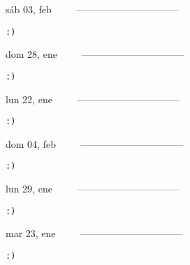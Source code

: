 \documentclass[letterpaper,10pt]{article}
\begin{document}
\begin{multicols}{3}
{sáb 03, feb\ \ \ \ \ --------------------------------}
\begin{flushright}\begin{small}\texttt{:)}\end{small}\end{flushright}
\vfill
{dom 28, ene\ \ \ \ \ --------------------------------}
\begin{flushright}\begin{small}\texttt{:)}\end{small}\end{flushright}\par
\vfill
{lun 22, ene\ \ \ \ \ --------------------------------}
\begin{flushright}\begin{small}\texttt{:)}\end{small}\end{flushright}\par
\vfill
\end{multicols}
\vspace{1.05cm}

\begin{multicols}{3}
{dom 04, feb\ \ \ \ \ --------------------------------}
\begin{flushright}\begin{small}\texttt{:)}\end{small}\end{flushright}
\vfill
{lun 29, ene\ \ \ \ \ --------------------------------}
\begin{flushright}\begin{small}\texttt{:)}\end{small}\end{flushright}\par
\vfill
{mar 23, ene\ \ \ \ \ --------------------------------}
\begin{flushright}\begin{small}\texttt{:)}\end{small}\end{flushright}\par
\vfill
\end{multicols}
\vspace{1.05cm}
\end{document}
